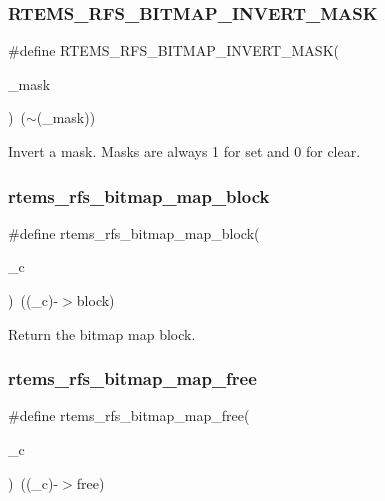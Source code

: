 \subsubsection{\texorpdfstring{RTEMS\_RFS\_BITMAP\_INVERT\_MASK}{RTEMS\_RFS\_BITMAP\_INVERT\_MASK}}
{\footnotesize\ttfamily \#define R\+T\+E\+M\+S\+\_\+\+R\+F\+S\+\_\+\+B\+I\+T\+M\+A\+P\+\_\+\+I\+N\+V\+E\+R\+T\+\_\+\+M\+A\+SK(\begin{DoxyParamCaption}\item[{}]{\+\_\+mask }\end{DoxyParamCaption})~($\sim$(\+\_\+mask))}

Invert a mask. Masks are always 1 for set and 0 for clear. \mbox{\label{rtems-rfs-bitmaps_8h_a72e94408c493773318bf497a9ffe7a65}} 
\subsubsection{\texorpdfstring{rtems\_rfs\_bitmap\_map\_block}{rtems\_rfs\_bitmap\_map\_block}}
{\footnotesize\ttfamily \#define rtems\+\_\+rfs\+\_\+bitmap\+\_\+map\+\_\+block(\begin{DoxyParamCaption}\item[{}]{\+\_\+c }\end{DoxyParamCaption})~((\+\_\+c)-\/$>$block)}

Return the bitmap map block. \mbox{\label{rtems-rfs-bitmaps_8h_a19da0df03523c1b92a30b41af0fa74a1}} 
\subsubsection{\texorpdfstring{rtems\_rfs\_bitmap\_map\_free}{rtems\_rfs\_bitmap\_map\_free}}
{\footnotesize\ttfamily \#define rtems\+\_\+rfs\+\_\+bitmap\+\_\+map\+\_\+free(\begin{DoxyParamCaption}\item[{}]{\+\_\+c }\end{DoxyParamCaption})~((\+\_\+c)-\/$>$free)}

